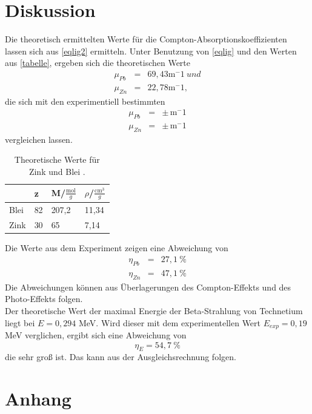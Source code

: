 \section{Diskussion}
\label{sec:Diskussion}


Die theoretisch ermittelten Werte für die Compton-Absorptionskoeffizienten lassen sich aus \eqref{eqlig2} ermitteln. Unter Benutzung von \eqref{eqlig} und den Werten aus \autoref{tabelle}, ergeben sich die theoretischen Werte
\begin{eqnarray}
  \mu_{Pb} &=& 69,43  \mathrm{m^-1}\ und \nonumber \\
  \mu_{Zn} &=& 22,78  \mathrm{m^-1}, \nonumber 
\end{eqnarray}
die sich mit den experimentiell bestimmten 
\begin{eqnarray}
  \mu_{Pb} &=&   \pm  \,  \mathrm{m^-1} \nonumber \\
  \mu_{Zn} &=&   \pm  \,  \mathrm{m^-1} \nonumber 
\end{eqnarray}
vergleichen lassen.
\begin{table}[H]
 \centering
 \caption{Theoretische Werte für Zink und Blei \cite{2} \cite{3}.}
 \begin{tabular}{l|l|l|l}
 & z & M/$\frac{\textrm{mol}}{g}$ & $\rho$/$\frac{\textrm{cm}^3}{g}$\\\hline
 Blei & 82 & 207,2 & 11,34\\
 Zink & 30 & 65 & 7,14\\\hline
 \end{tabular}
 \label{tabelle}
\end{table}
Die Werte aus dem Experiment zeigen eine Abweichung von
\begin{eqnarray}
  \eta_{Pb} &=& 27,1 \ \% \nonumber \\
  \eta_{Zn} &=& 47,1 \ \% \nonumber 
\end{eqnarray}
Die Abweichungen können aus Überlagerungen des Compton-Effekts und des Photo-Effekts folgen.\\
Der theoretische Wert der maximal Energie der Beta-Strahlung von Technetium liegt bei $E=0,294$ MeV. Wird dieser mit dem experimentellen Wert $E_{exp}=0,19$ MeV verglichen, ergibt sich eine Abweichung von 
\begin{equation*}
  \eta_{E}=54,7 \ \%
\end{equation*}
die sehr groß ist. Das kann aus der Ausgleichsrechnung folgen. 

\section{Anhang}
\label{sec:anhang}

